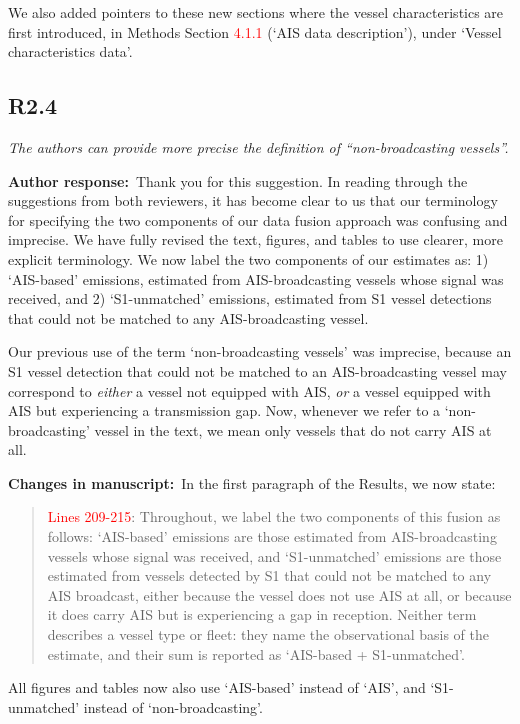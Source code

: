 \documentclass[11pt]{article}
\newcommand{\point}[1]{\subsection*{\normalfont\bfseries #1}}
\newcommand{\response}{\par\medskip\noindent%
  \textbf{\textcolor{respblue}{Author response:}}\ }
\newcommand{\changes}{\par\medskip\noindent%
  \textbf{\textcolor{changegreen}{Changes in manuscript:}}\ }
\begin{document}
We also added pointers to these new sections where the vessel characteristics are first introduced, in Methods Section \textcolor{red}{4.1.1} (`AIS data description'), under `Vessel characteristics data'.


\point{R2.4}

\begin{refquote}\itshape
The authors can provide more precise the definition of ``non-broadcasting
vessels''.
\end{refquote}

\response Thank you for this suggestion. In reading through the suggestions from both reviewers, it has become clear to us that our terminology for specifying the two components of our data fusion approach was confusing and imprecise. We have fully revised the text, figures, and tables to use clearer, more explicit terminology. We now label the two components of our estimates as: 1) `AIS-based' emissions, estimated from AIS-broadcasting vessels whose signal was received, and 2) `S1-unmatched' emissions, estimated from S1 vessel detections that could not be matched to any AIS-broadcasting vessel. 

Our previous use of the term `non-broadcasting vessels' was imprecise, because an S1 vessel detection that could not be matched to an AIS-broadcasting vessel may correspond to \textit{either} a vessel not equipped with AIS, \textit{or} a vessel equipped with AIS but experiencing a transmission gap. Now, whenever we refer to a `non-broadcasting' vessel in the text, we mean only vessels that do not carry AIS at all.

\changes In the first paragraph of the Results, we now state:

\begin{quote}
\textcolor{red}{Lines 209-215}: Throughout, we label the two components of this fusion as follows: `AIS-based' emissions are those estimated from AIS-broadcasting vessels whose signal was received, and `S1-unmatched' emissions are those estimated from vessels detected by S1 that could not be matched to any AIS broadcast, either because the vessel does not use AIS at all, or because it does carry AIS but is experiencing a gap in reception. Neither term describes a vessel type or fleet: they name the observational basis of the estimate, and their sum is reported as `AIS-based + S1-unmatched'.
\end{quote}

All figures and tables now also use `AIS-based' instead of `AIS', and `S1-unmatched' instead of `non-broadcasting'.
\end{document}
